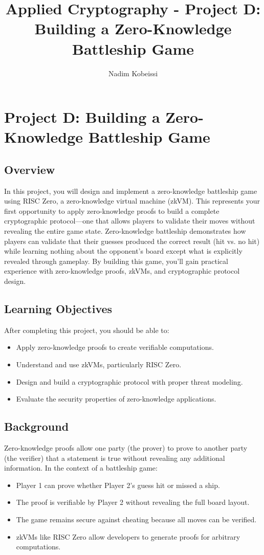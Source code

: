 \documentclass[10pt,a4paper,american]{exam}
\title{Applied Cryptography - Project D: Building a Zero-Knowledge Battleship Game}
\author{Nadim Kobeissi}
\begin{document}
\classhandoutheader
\section*{Project D: Building a Zero-Knowledge Battleship Game}

\subsection*{Overview}
In this project, you will design and implement a zero-knowledge battleship game using RISC Zero, a zero-knowledge virtual machine (zkVM). This represents your first opportunity to apply zero-knowledge proofs to build a complete cryptographic protocol—one that allows players to validate their moves without revealing the entire game state. Zero-knowledge battleship demonstrates how players can validate that their guesses produced the correct result (hit vs. no hit) while learning nothing about the opponent's board except what is explicitly revealed through gameplay. By building this game, you'll gain practical experience with zero-knowledge proofs, zkVMs, and cryptographic protocol design.

\subsection*{Learning Objectives}
After completing this project, you should be able to:
\begin{itemize}
	\item Apply zero-knowledge proofs to create verifiable computations.
	\item Understand and use zkVMs, particularly RISC Zero.
	\item Design and build a cryptographic protocol with proper threat modeling.
	\item Evaluate the security properties of zero-knowledge applications.
\end{itemize}

\subsection*{Background}
Zero-knowledge proofs allow one party (the prover) to prove to another party (the verifier) that a statement is true without revealing any additional information. In the context of a battleship game:
\begin{itemize}
	\item Player 1 can prove whether Player 2's guess hit or missed a ship.
	\item The proof is verifiable by Player 2 without revealing the full board layout.
	\item The game remains secure against cheating because all moves can be verified.
	\item zkVMs like RISC Zero allow developers to generate proofs for arbitrary computations.
\end{itemize}
\end{document}
